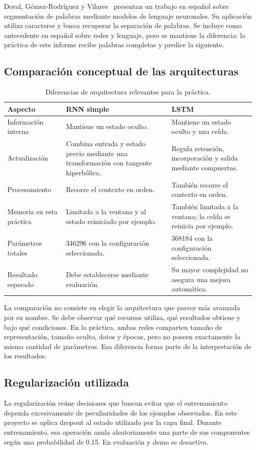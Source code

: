 Doval, Gómez-Rodríguez y Vilares~\cite{doval2016} presentan un trabajo en español sobre segmentación de palabras mediante modelos de lenguaje neuronales. Su aplicación utiliza caracteres y busca recuperar la separación de palabras. Se incluye como antecedente en español sobre redes y lenguaje, pero se mantiene la diferencia: la práctica de este informe recibe palabras completas y predice la siguiente.

\subsection{Comparación conceptual de las arquitecturas}
\begin{table}[tb]
\caption{Diferencias de arquitectura relevantes para la práctica.}
\centering
\begin{tabular}{p{}p{}p{}}
\toprule Aspecto & RNN simple & LSTM\\\midrule
Información interna & Mantiene un estado oculto. & Mantiene un estado oculto y una celda.\\
Actualización & Combina entrada y estado previo mediante una transformación con tangente hiperbólica. & Regula retención, incorporación y salida mediante compuertas.\\
Procesamiento & Recorre el contexto en orden. & También recorre el contexto en orden.\\
Memoria en esta práctica & Limitada a la ventana y al estado reiniciado por ejemplo. & También limitada a la ventana; la celda se reinicia por ejemplo.\\
Parámetros totales & 346296 con la configuración seleccionada. & 368184 con la configuración seleccionada.\\
Resultado esperado & Debe establecerse mediante evaluación. & Su mayor complejidad no asegura una mejora automática.\\\bottomrule
\end{tabular}
\end{table}

La comparación no consiste en elegir la arquitectura que parece más avanzada por su nombre. Se debe observar qué recursos utiliza, qué resultados obtiene y bajo qué condiciones. En la práctica, ambas redes comparten tamaño de representación, tamaño oculto, datos y épocas, pero no poseen exactamente la misma cantidad de parámetros. Esa diferencia forma parte de la interpretación de los resultados.

\subsection{Regularización utilizada}
La regularización reúne decisiones que buscan evitar que el entrenamiento dependa excesivamente de peculiaridades de los ejemplos observados. En este proyecto se aplica dropout al estado utilizado por la capa final. Durante entrenamiento, esa operación anula aleatoriamente una parte de sus componentes según una probabilidad de 0.15. En evaluación y demo se desactiva.

